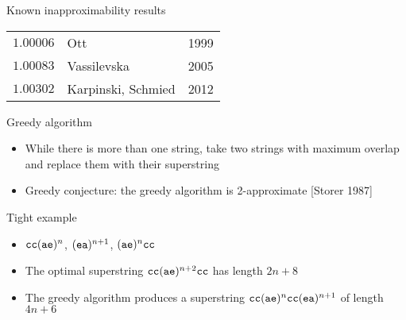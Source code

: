 \begin{frame}{Known inapproximability results}
\begin{center}
\begin{tabular}{lll}
$1.00006$ & Ott & 1999\\
$1.00083$ & Vassilevska & 2005\\
$1.00302$ & {Karpinski, Schmied} & 2012\\
\end{tabular}
\end{center}
\end{frame}

\begin{frame}{Greedy algorithm}
\begin{itemize}[<+->]
\item While there is more than one string, take two strings with maximum overlap and replace them with their superstring
\item Greedy conjecture: the greedy algorithm is 2-approximate [Storer 1987]
\end{itemize}
\end{frame}

\begin{frame}{Tight example}
\begin{itemize}[<+->]
\item ${\tt cc}({\tt ae})^n$, $({\tt ea})^{n+1}$, $ ({\tt ae})^n{\tt cc}$
\item The optimal superstring ${\tt cc}({\tt ae})^{n+2}{\tt cc}$ has length $2n+8$
\item The greedy algorithm produces a superstring ${\tt cc}({\tt ae})^n{\tt cc}({\tt ea})^{n+1}$ of length $4n+6$
\end{itemize}
\end{frame}


